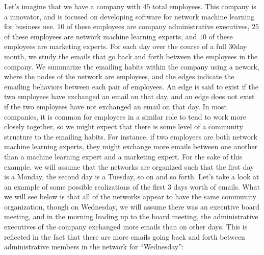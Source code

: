 \documentclass[letterpaper,10pt,english]{jupyterBook}
\begin{document}
\sphinxAtStartPar
Let’s imagine that we have a company with \(45\) total employees. This company is a  innovator, and is focused on developing software for network machine learning for business use. \(10\) of these employees are company administrative executives, \(25\) of these employees are network machine learning experts, and \(10\) of these employees are marketing experts. For each day over the course of a full \(30\)\sphinxhyphen{}day month, we study the emails that go back and forth between the employees in the company. We summarize the emailing habits within the company using a nework, where the nodes of the network are employees, and the edges indicate the emailing behaviors between each pair of employees. An edge is said to exist if the two employees have exchanged an email on that day, and an edge does not exist if the two employees have not exchanged an email on that day. In most companies, it is common for employees in a similar role to tend to work more closely together, so we might expect that there is some level of a community structure to the emailing habits. For instance, if two employees are both network machine learning experts, they might exchange more emails between one another than a machine learning expert and a marketing expert. For the sake of this example, we will assume that the networks are organized such that the first day is a Monday, the second day is a Tuesday, so on and so forth. Let’s take a look at an example of some possible realizations of the first \(3\) days worth of emails. What we will see below is that all of the networks appear to have the same community organization, though on Wednesday, we will assume there was an executive board meeting, and in the morning leading up to the board meeting, the administrative executives of the company exchanged more emails than on other days. This is reflected in the fact that there are more emails going back and forth between administrative members in the network for “Wednesday”:

\noindent{}
\end{document}
